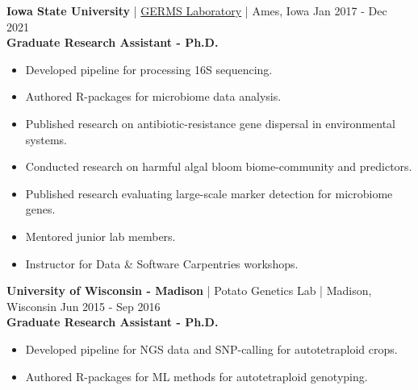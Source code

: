 
\textbf{Iowa State University} | \href{http://www.germslab.org/}{{\color{black}GERMS Laboratory}} | Ames, Iowa \hfill Jan 2017 - Dec 2021  \\
    \tab \textbf{Graduate Research Assistant - Ph.D.} 
    \begin{addmargin}[1cm]{2cm}
    \begin{itemize}[left=-0.2cm, itemsep=-0.15cm]
        \item Developed pipeline for processing 16S sequencing.
        \item Authored R-packages for microbiome data analysis.
        \item Published research on antibiotic-resistance gene dispersal in environmental systems.
        \item Conducted research on harmful algal bloom biome-community and predictors.
        \item Published research evaluating large-scale marker detection for microbiome genes.
        \item Mentored junior lab members.
        \item Instructor for Data \& Software Carpentries workshops.
    \end{itemize}
    \end{addmargin}

\textbf{University of Wisconsin - Madison} | Potato Genetics Lab | Madison, Wisconsin \hfill Jun 2015 - Sep 2016 \\
    \tab \textbf{Graduate Research Assistant - Ph.D.} \\
    \begin{addmargin}[1cm]{2cm}
    \begin{itemize}[left=-0.2cm, itemsep=-0.15cm]
        \item Developed pipeline for NGS data and SNP-calling for autotetraploid crops.
        \item Authored R-packages for ML methods for autotetraploid genotyping.
    \end{itemize}
    \end{addmargin}

